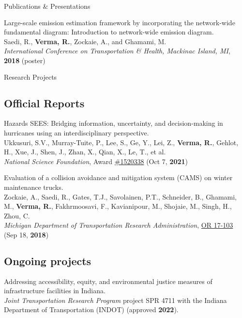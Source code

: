 \documentclass{CV} %
\begin{document}
\begin{rSection}{Publications \& Presentations}
\begin{etaremune}
        \item Large-scale emission estimation framework by incorporating the network-wide fundamental diagram: Introduction to network-wide emission diagram.
        \\ Saedi, R., \textbf{Verma, R.}, Zockaie, A., and Ghamami, M.
        \\ \textit{International Conference on Transportation \& Health, Mackinac Island, MI}, \textbf{2018} (poster)
    \end{etaremune}
\end{rSection}

\begin{rSection}{Research Projects}
    \subsection*{Official Reports}
    \begin{etaremune}
        \item Hazards SEES: Bridging information, uncertainty, and decision-making in hurricanes using an interdisciplinary perspective.
        \\ Ukkusuri, S.V., Murray-Tuite, P., Lee, S., Ge, Y., Lei, Z., \textbf{Verma, R.}, Gehlot, H., Xue, J., Shen, J., Zhan, X., Qian, X., Le, T., et al.
        \\ \textit{National Science Foundation}, Award \href{https://www.nsf.gov/awardsearch/showAward?AWD_ID=1520338}{\#1520338} (Oct 7, \textbf{2021})
        
        \item Evaluation of a collision avoidance and mitigation system (CAMS) on winter maintenance trucks.
        \\ Zockaie, A., Saedi, R., Gates, T.J., Savolainen, P.T., Schneider, B., Ghamami, M., \textbf{Verma, R.}, Fakhrmoosavi, F., Kavianipour, M., Shojaie, M., Singh, H., Zhou, C.
        \\ \textit{Michigan Department of Transportation Research Administration}, \href{https://rosap.ntl.bts.gov/view/dot/42752}{OR 17-103} (Sep 18, \textbf{2018})
    \end{etaremune}

    \subsection*{Ongoing projects}
    \begin{etaremune}
        \item Addressing accessibility, equity, and environmental justice measures of infrastructure facilities in Indiana.
        \\ \textit{Joint Transportation Research Program} project SPR 4711 with the Indiana Department of Transportation (INDOT) (approved \textbf{2022}).


\end{etaremune}
\end{rSection}
\end{document}
